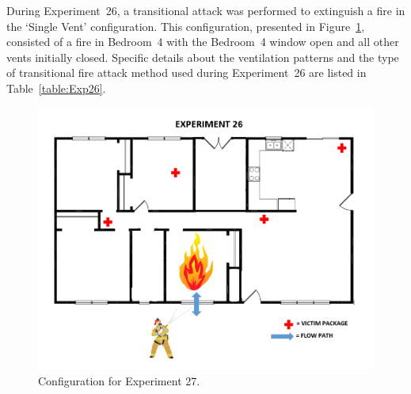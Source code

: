 \documentclass[12pt,oneside]{book}
\begin{document}
During Experiment~26, a transitional attack was performed to extinguish a fire in the `Single Vent' configuration. This configuration, presented in Figure~\ref{fig:Single_Vent_ext_alt2}, consisted of a fire in Bedroom~4 with the Bedroom~4 window open and all other vents initially closed. Specific details about the ventilation patterns and the type of transitional fire attack method used during Experiment~26 are listed in Table~\ref{table:Exp26}.


\begin{figure}[H]
	\centering
	\includegraphics[width=5in]{Figures/General/Exp27.png}
	\caption{Configuration for Experiment 27.}
	\label{fig:Single_Vent_ext_alt2}
\end{figure}

\begin{table}[H]
\caption{Experiment 26}
\centering
{}
\label{table:Exp26}
\end{table}
\end{document}
